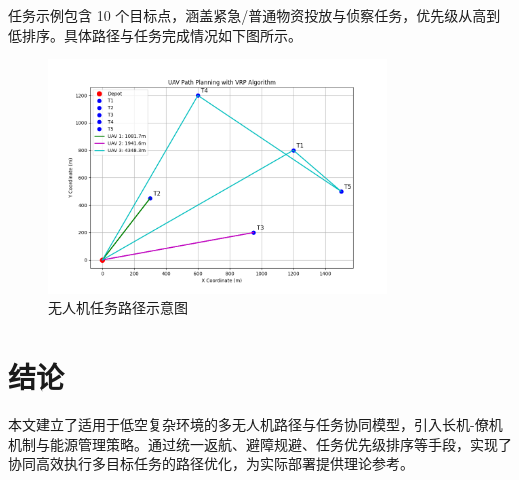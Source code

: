 \documentclass[12pt,fontset=adobe]{ctexart}
\begin{document}
任务示例包含 10 个目标点，涵盖紧急/普通物资投放与侦察任务，优先级从高到低排序。具体路径与任务完成情况如下图所示。

\begin{figure}[h]
    \centering
    \includegraphics[width=0.8\textwidth]{example-path.png}
    \caption{无人机任务路径示意图}
\end{figure}

\section{结论}
本文建立了适用于低空复杂环境的多无人机路径与任务协同模型，引入长机-僚机机制与能源管理策略。通过统一返航、避障规避、任务优先级排序等手段，实现了协同高效执行多目标任务的路径优化，为实际部署提供理论参考。
\end{document}
